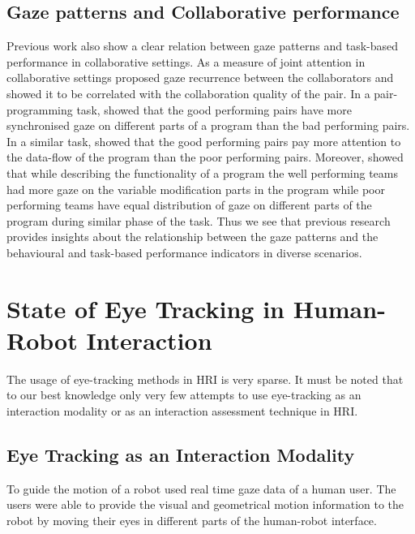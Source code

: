 \documentclass{sig-alternate}
\begin{document}
\subsection{Gaze patterns and Collaborative performance}

Previous work also show a clear relation between gaze patterns and
task-based performance in collaborative settings. As a measure of joint attention in collaborative settings  \cite{richardson2007art} proposed gaze recurrence between the collaborators and showed it to be correlated with the collaboration quality of the pair. In a pair-programming task, \cite{jermann2012effects} showed that the good performing pairs have more synchronised gaze on different parts of a program than the bad performing pairs. In a similar task, \cite{sharma2012gaze} showed that the good performing pairs pay more attention to the data-flow of the program than the poor performing pairs. Moreover, \cite{sharma2013understanding} showed that while describing the functionality of a program the well performing teams had more gaze on the variable modification parts in the program while poor performing teams have equal distribution of gaze on different parts of the program during similar phase of the task.  Thus we see that previous research provides insights about the relationship between the gaze patterns and the behavioural and task-based performance indicators in diverse scenarios.





\section{State of Eye Tracking in Human-Robot Interaction}

The usage of eye-tracking methods in HRI is very sparse. It must be noted that to our best knowledge only very few attempts to use eye-tracking as an interaction modality or as an interaction assessment technique in HRI.

\subsection{Eye Tracking as an Interaction Modality}

To guide the motion of a robot \cite{bhuiyan2004tracking} used real time  gaze data of a human user. The users were able to provide the visual and geometrical motion information to the robot by moving their eyes in different parts of the human-robot interface.
\end{document}
